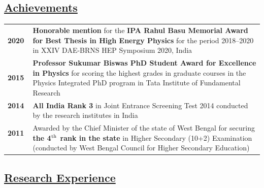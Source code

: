 \documentclass[a4paper,11pt]{article}
\begin{document}
{\subsection*{\underline{Achievements}}

\begin{tabular}{ p{2cm} p{13cm} }
\textbf{2020} & {\textbf{Honorable mention} for the \textbf{IPA Rahul Basu Memorial Award for Best Thesis in High Energy Physics} for the period 2018--2020 in XXIV DAE-BRNS HEP Symposium 2020, India} \\
\textbf{2015} & {\textbf{Professor Sukumar Biswas PhD Student Award for Excellence in Physics} for scoring the highest grades in graduate courses in the Physics Integrated PhD program in Tata Institute of Fundamental Research} \\
\textbf{2014} \ & \textbf{All India Rank 3} in Joint Entrance Screening Test 2014 conducted by the research institutes in India  \\
\textbf{2011} \ & Awarded by the Chief Minister of the state of West Bengal for securing \textbf{the 4$^{\rm{th}}$ rank in the state} in Higher Secondary (10+2) Examination (conducted by West Bengal Council for Higher Secondary Education)  \\
\end{tabular}

\subsection*{\underline{Research Experience}}

}
\end{document}
